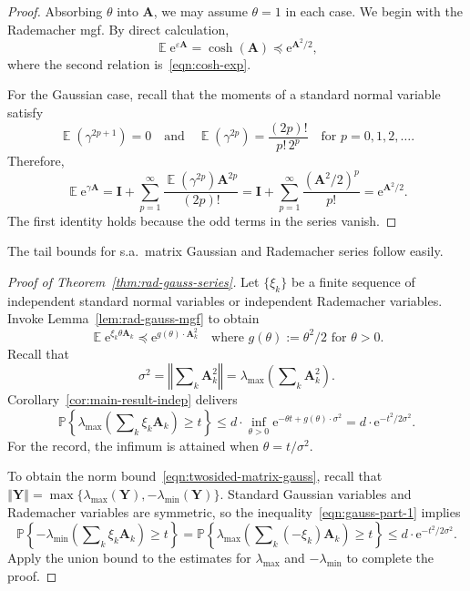\documentclass[11pt,letterpaper,twoside,reqno,draft]{amsart}
\theoremstyle{remark}
\numberwithin{equation}{section}
\numberwithin{thm}{section}
\begin{document}
\begin{proof}
Absorbing $\theta$ into ${\bm{{A}}}$, we may assume $\theta = 1$ in each case.  We begin with the Rademacher mgf.  By direct calculation,
$$
{\operatorname{\mathbb{E}}} {\mathrm{e}}^{{\varepsilon} {\bm{{A}}}}
	= \cosh({\bm{{A}}})
	{\preccurlyeq} {\mathrm{e}}^{{\bm{{A}}}^2/2},
$$
where the second relation is~\eqref{eqn:cosh-exp}.

For the Gaussian case, recall that the moments of a standard normal variable satisfy
$$
{\operatorname{\mathbb{E}}}( \gamma^{2p+1} ) = 0
\quad\text{and}\quad
{\operatorname{\mathbb{E}}}( \gamma^{2p} ) = \frac{(2p)!}{p! \, 2^p}
\quad\text{for $p = 0, 1, 2, \dots$}.
$$
Therefore,
$$
{\operatorname{\mathbb{E}}} {\mathrm{e}}^{\gamma {\bm{{A}}}}
	= {\mathbf{I}} + \sum_{p=1}^\infty \frac{{\operatorname{\mathbb{E}}}(\gamma^{2p}) {\bm{{A}}}^{2p}}{(2p)!}
	= {\mathbf{I}} + \sum_{p=1}^\infty \frac{({\bm{{A}}}^2/2)^p}{p!}
	= {\mathrm{e}}^{ {\bm{{A}}}^2 / 2 }.
$$
The first identity holds because the odd terms in the series vanish.
\end{proof}

The tail bounds for s.a.~matrix Gaussian and Rademacher series follow easily.

\begin{proof}[Proof of Theorem~\ref{thm:rad-gauss-series}]
Let $\{\xi_k\}$ be a finite sequence of independent standard normal variables or independent Rademacher variables.
Invoke Lemma~\ref{lem:rad-gauss-mgf} to obtain 
$$
{\operatorname{\mathbb{E}}} {\mathrm{e}}^{\xi_k \theta {\bm{{A}}}_k}
{\preccurlyeq} {\mathrm{e}}^{g(\theta) \cdot {\bm{{A}}}_k^2}
\quad\text{where $g(\theta) := \theta^2/2$ for $\theta > 0$.}
$$
Recall that
$$
\sigma^2 = {\left\Vert {{ \sum\nolimits_k {\bm{{A}}}_k^2 }} \right\Vert} = \lambda_{\max}\left(\sum\nolimits_k {\bm{{A}}}_k^2\right).
$$
Corollary~\ref{cor:main-result-indep} delivers
\begin{equation} \label{eqn:gauss-part-1}
{\mathbb{P}\left\{ {{ \lambda_{\max}\left( \sum\nolimits_k \xi_k {\bm{{A}}}_k \right) \geq t }} \right\}}
	\leq d \cdot \inf_{\theta > 0} {\mathrm{e}}^{ - \theta t + g(\theta) \cdot \sigma^2 }
	= d \cdot {\mathrm{e}}^{-t^2/2\sigma^2}.
\end{equation}
For the record, the infimum is attained when $\theta = t/\sigma^2$.

To obtain the norm bound~\eqref{eqn:twosided-matrix-gauss}, recall that ${\left\Vert {{ {\bm{{Y}}} }} \right\Vert} = \max\{ \lambda_{\max}({\bm{{Y}}}), - \lambda_{\min}({\bm{{Y}}}) \}$.  Standard Gaussian variables and Rademacher variables are symmetric, so the inequality~\eqref{eqn:gauss-part-1} implies
$$
{\mathbb{P}\left\{ {{ - \lambda_{\min}\left( \sum\nolimits_k \xi_k {\bm{{A}}}_k \right) \geq t }} \right\}}
	= {\mathbb{P}\left\{ {{ \lambda_{\max}\left( \sum\nolimits_k (-\xi_k) {\bm{{A}}}_k \right) \geq t }} \right\}}
	\leq d \cdot {\mathrm{e}}^{-t^2/2\sigma^2}.
$$
Apply the union bound to the estimates for $\lambda_{\max}$ and $-\lambda_{\min}$ to complete the proof.
\end{proof}
\end{document}

